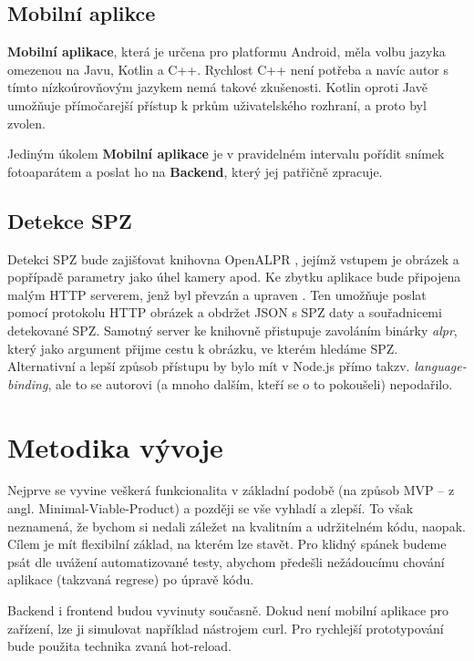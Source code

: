 \subsection{Mobilní aplikce} \label{mobile_app}

\textbf{Mobilní aplikace}, která je určena pro platformu Android, měla volbu jazyka omezenou na Javu, Kotlin a C++.
Rychlost C++ není potřeba a navíc autor s tímto nízkoúrovňovým jazykem nemá takové zkušenosti.
Kotlin oproti Javě umožňuje přímočarejší přístup k prkům uživatelského rozhraní, a proto byl zvolen.

Jediným úkolem \textbf{Mobilní aplikace} je v pravidelném intervalu pořídit snímek fotoaparátem a poslat ho na
\textbf{Backend}, který jej patřičně zpracuje.

\subsection{Detekce SPZ}

Detekci SPZ bude zajišťovat knihovna OpenALPR \citep[viz][]{OpenALPR}, jejímž vstupem je obrázek a popřípadě
parametry jako úhel kamery apod. Ke zbytku aplikace bude připojena malým HTTP serverem, jenž byl převzán a upraven
\citep[viz][]{OpenALPR_Server}.
Ten umožňuje poslat pomocí protokolu HTTP obrázek a obdržet JSON s SPZ daty a souřadnicemi detekované SPZ.
Samotný server ke knihovně přistupuje zavoláním binárky \textit{alpr}, který jako argument přijme cestu k
obrázku, ve kterém hledáme SPZ. Alternativní a lepší způsob přístupu by bylo mít v Node.js přímo takzv.
\textit{language-binding}, ale to se autorovi (a mnoho dalším, kteří se o to pokoušeli) nepodařilo.

\section{Metodika vývoje}

Nejprve se vyvine veškerá funkcionalita v základní podobě
(na způsob MVP -- z angl. Minimal-Viable-Product) a později se vše vyhladí a zlepší. To však neznamená,
že bychom si nedali záležet na kvalitním a udržitelném kódu, naopak. Cílem je mít flexibilní základ,
na kterém lze stavět. Pro klidný spánek budeme psát dle uvážení automatizované testy, abychom předešli
nežádoucímu chování aplikace (takzvaná regrese) po úpravě kódu.

Backend i frontend budou vyvinuty současně. Dokud není mobilní aplikace pro zařízení, lze ji simulovat
například nástrojem curl. Pro rychlejší prototypování bude použita technika zvaná hot-reload.